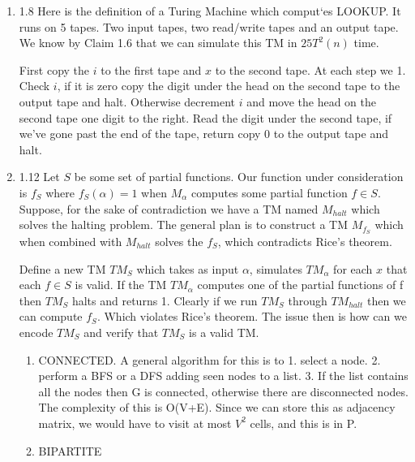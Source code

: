 \documentclass[11pt,fleqn]{article}
\begin{document}
\begin{enumerate}
\item 1.8
Here is the definition of a Turing Machine which comput`es LOOKUP. It runs on 5 tapes. Two input tapes, two read/write tapes and an output tape. We know by Claim 1.6 that we can simulate this TM in $25T^2(n)$ time.

First copy the $i$ to the first tape and $x$ to the second tape. At each step we 1. Check $i$, if it is zero copy the digit under the head on the second tape to the output tape and halt. Otherwise decrement $i$ and move the head on the second tape one digit to the right. Read the digit under the second tape, if we've gone past the end of the tape, return copy 0 to the output tape and halt. 

\item 1.12 
Let $S$ be some set of partial functions. Our function under consideration is $f_S$ where $f_S(\alpha)=1$ when $M_\alpha$ computes some partial function $f \in S$. Suppose, for the sake of contradiction we have a TM named $M_{halt}$ which solves the halting problem. The general plan is to construct a TM $M_{f_S}$ which when combined with $M_{halt}$ solves the $f_S$, which contradicts Rice's theorem. 

Define a new TM $TM_S$ which takes as input $\alpha$, simulates $TM_\alpha$ for each $x$ that each $f \in S$ is valid.  If the TM $TM_\alpha$ computes one of the partial functions of f then $TM_S$ halts and returns 1. Clearly if we run $TM_S$ through $TM_{halt}$ then we can compute $f_S$. Which violates Rice's theorem. The issue then is how can we encode $TM_S$ and verify that $TM_S$ is a valid TM. 

\begin{enumerate}
\item CONNECTED. A general algorithm for this is to 1. select a node. 2. perform a BFS or a DFS adding seen nodes to a list. 3. If the list contains all the nodes then G is connected, otherwise there are disconnected nodes. The complexity of this is O(V+E). Since we can store this as adjacency matrix, we would have to visit at most $V^2$ cells, and this is in P. 

\item BIPARTITE


\end{enumerate}

\end{enumerate}
\end{document}
